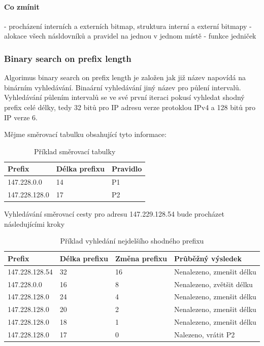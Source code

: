 \paragraph{Co zmínit}
- procházení interních a externích bitmap, struktura interní a externí bitmapy
- alokace všech násldovníků a pravidel na jednou v jednom místě
- funkce jedniček

\subsubsection{Binary search on prefix length}
Algorimus binary search on prefix length je založen jak již název napovídá na binárním vyhledávání.
Binaární vyhledávání jiný název pro půlení intervalů. Vyhledávání půlením intervalů
se ve své první iteraci pokusí vyhledat shodný prefix celé délky, tedy 32 bitů pro IP adresu
verze protoklou IPv4 a 128 bitů pro IP verze 6.

Mějme směrovací tabulku obsahující tyto informace:

\begin{table}[!htbp]
	\center
    \begin{tabular}{|l|l|l|}
    \hline
    Prefix        & Délka prefixu & Pravidlo \\ \hline
    147.228.0.0   & 14            & P1       \\ \hline
    147.228.128.0 & 17            & P2       \\ \hline
    \end{tabular}
    \caption{Příklad směrovací tabulky}
\end{table}

Vyhledávání směrovací cesty pro adresu 147.229.128.54 bude procházet následujícími kroky

\begin{table}[!htbp]
	\center
    \begin{tabular}{|l|l|l|l|}
    \hline
    Prefix & Délka prefixu  & Změna prefixu & Průběžný výsledek \\ \hline
    147.228.128.54 & 32 & 16 & Nenalezeno, zmenšit délku \\ \hline
    147.228.0.0 & 16 & 8 & Nenalezeno, zvětšit délku \\ \hline
    147.228.128.0 & 24 & 4 & Nenalezeno, zmenšit délku \\ \hline
    147.228.128.0 & 20 & 2 & Nenalezeno, zmenšit délku \\ \hline
    147.228.128.0 & 18 & 1 & Nenalezeno, zmenšit délku \\ \hline
    147.228.128.0 & 17 & 0 & Nalezeno, vrátit P2 \\ \hline
    \end{tabular}
    \caption{Příklad vyhledání nejdelšího shodného prefixu}
\end{table}

